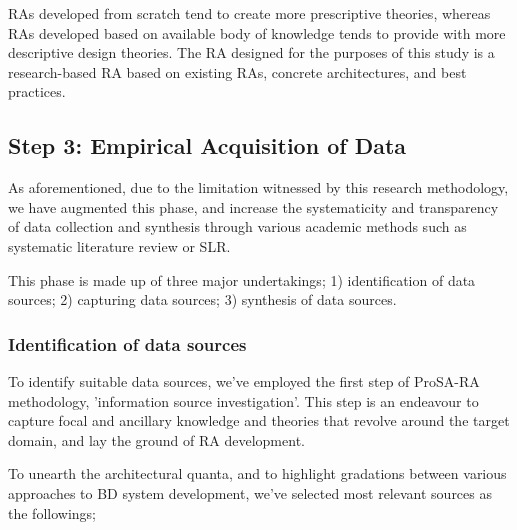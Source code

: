 \documentclass[review]{elsarticle}
\begin{document}
RAs developed from scratch tend to create more prescriptive theories, whereas RAs developed based on available body of knowledge tends to provide with more descriptive design theories. The RA designed for the purposes of this study is a research-based RA based on existing RAs, concrete architectures, and best practices.

\subsection{Step 3: Empirical Acquisition of Data }

As aforementioned, due to the limitation witnessed by this research methodology, we have augmented this phase, and increase the systematicity and transparency of data collection and synthesis through various academic methods such as systematic literature review or SLR.

This phase is made up of three major undertakings; 1) identification of data sources; 2) capturing data sources; 3) synthesis of data sources.

\subsubsection{Identification of data sources}

To identify suitable data sources, we've employed the first step of ProSA-RA methodology, 'information source investigation'. This step is an endeavour to capture focal and ancillary knowledge and theories that revolve around the target domain, and lay the ground of RA development.

To unearth the architectural quanta, and to highlight gradations between various approaches to BD system development, we've selected most relevant sources as the followings;
\end{document}

